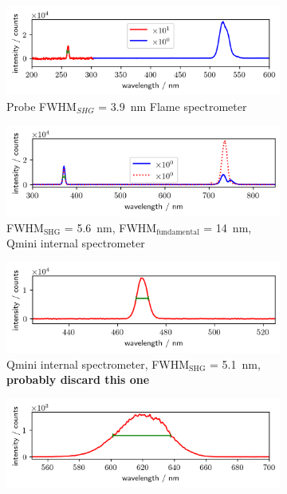 \documentclass[twoside,openright]{scrreprt}
\begin{document}
\begin{figure}[hbtp]
\begin{subfigure}[b]{\textwidth}
\centering
\includegraphics[scale=1]{images/spectra/SpectrumExampleNoFilter_260nm.png}
\caption{Probe FWHM$_{SHG}$ = \SI{3.9}{\nano\meter} Flame spectrometer}
\end{subfigure}
\begin{subfigure}[b]{\textwidth}
\centering
\includegraphics[scale=1]{images/spectra/SpectrumExampleNoFilter_371nm.png}
\caption{FWHM$_{\mathrm{SHG}}$ = \SI{5.6}{\nano\meter}, FWHM$_{\mathrm{fundamental}}$ = \SI{14}{\nano\meter}, Qmini internal spectrometer\label{fig:SHG_offCenterComp}}
\end{subfigure}
\begin{subfigure}[b]{\textwidth}
\centering
\includegraphics[scale=1]{images/spectra/SpectrumExampleNoFilter_470nm.png}
\caption{Qmini internal spectrometer, FWHM$_{\mathrm{SHG}}$ = \SI{5.1}{\nano\meter}, \textbf{probably discard this one}}
\end{subfigure}
\begin{subfigure}[b]{\textwidth}
\centering
\includegraphics[scale=1]{images/spectra/ActonMonochromatorCharacterisation/620nmSpectrumProbe.png}

\end{subfigure}
\end{figure}
\end{document}
